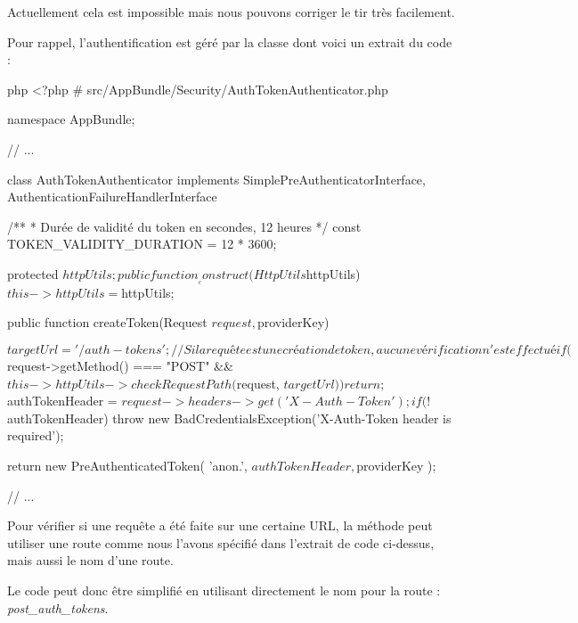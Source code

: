 \documentclass[big]{zmdocument}
\begin{document}
Actuellement cela est impossible mais nous pouvons corriger le tir très facilement.



Pour rappel, l'authentification est géré par la classe  dont voici un extrait du code :



\begin{CodeBlock}{php}
<?php
# src/AppBundle/Security/AuthTokenAuthenticator.php

namespace AppBundle\Security;

// ...

class AuthTokenAuthenticator implements SimplePreAuthenticatorInterface, AuthenticationFailureHandlerInterface
{
    /**
    * Durée de validité du token en secondes, 12 heures
    */
    const TOKEN_VALIDITY_DURATION = 12 * 3600;

    protected $httpUtils;

    public function __construct(HttpUtils $httpUtils)
    {
        $this->httpUtils = $httpUtils;
    }

    public function createToken(Request $request, $providerKey)
    {
        $targetUrl = '/auth-tokens';
        // Si la requête est une création de token, aucune vérification n'est effectué
        if ($request->getMethod() === "POST" && $this->httpUtils->checkRequestPath($request, $targetUrl)) {
            return;
        }
      
        $authTokenHeader = $request->headers->get('X-Auth-Token');

        if (!$authTokenHeader) {
            throw new BadCredentialsException('X-Auth-Token header is required');
        }

        return new PreAuthenticatedToken(
            'anon.',
            $authTokenHeader,
            $providerKey
        );
    }
    // ...
}
\end{CodeBlock}



Pour vérifier si une requête a été faite sur une certaine URL, la méthode  peut utiliser une route comme nous l'avons spécifié dans l'extrait de code ci-dessus, mais aussi le nom d'une route.



Le code peut donc être simplifié en utilisant directement le nom pour la route  : \textit{post\_auth\_tokens}.
\end{document}
